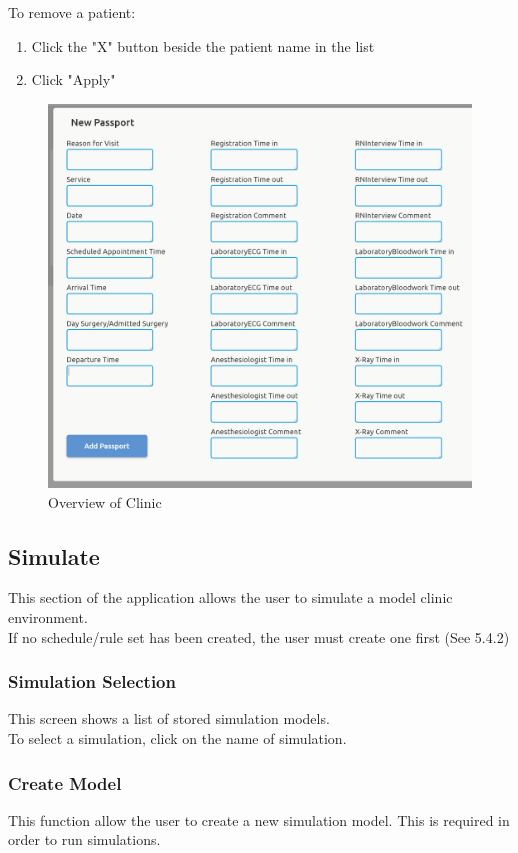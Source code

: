 \documentclass[12pt]{article}
\begin{document}
To remove a patient:
\begin{enumerate}
\item Click the "X" button beside the patient name in the list
\item Click "Apply"
\end{enumerate}

\begin{figure}[H]
\centering
\includegraphics[width=\textwidth]{newPass}
\caption{Overview of Clinic}
\end{figure}

\subsection{Simulate}
This section of the application allows the user to simulate a model clinic environment. \\
If no schedule/rule set has been created, the user must create one first (See 5.4.2) \\

\subsubsection{Simulation Selection}
This screen shows a list of stored simulation models. \\

To select a simulation, click on the name of simulation.

\subsubsection{Create Model}
This function allow the user to create a new simulation model. This is required in order to run simulations. \\
\end{document}
